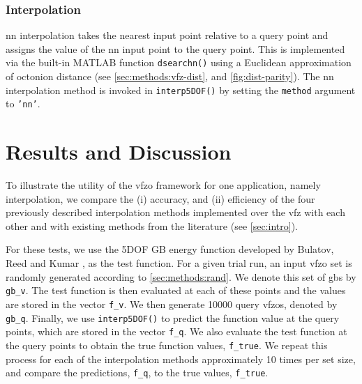 \documentclass[final,twocolumn,12pt]{elsarticle}
\newcommand{\inpt}{input}
\begin{document}
\subsubsection{ Interpolation}
\label{sec:methods:interp:nn}


\Gls{nn} interpolation takes the nearest \inpt{} point relative to a query point and assigns the value of the \gls{nn} \inpt{} point to the query point. This is implemented via the built-in MATLAB function \texttt{dsearchn()} using a Euclidean approximation of octonion distance (see \cref{sec:methods:vfz-dist}, and \cref{fig:dist-parity}). The \gls{nn} interpolation method is invoked in \texttt{interp5DOF()} by setting the \texttt{method} argument to \texttt{'nn'}.

\section{Results and Discussion} \label{sec:results}

To illustrate the utility of the \gls{vfzo} framework for one application, namely interpolation, we compare the (i) accuracy, and (ii) efficiency of the four previously described interpolation methods implemented over the \gls{vfz} with each other and with existing methods from the literature (see \cref{sec:intro}).

For these tests, we use the 5DOF GB energy function developed by Bulatov, Reed and Kumar \cite{bulatovGrainBoundaryEnergy2014}, as the test function. For a given trial run, an \inpt{} \gls{vfzo} set is randomly generated according to \cref{sec:methods:rand}. We denote this set of \glspl{gb} by \texttt{gb\_v}. The test function is then evaluated at each of these points and the values are stored in the vector \texttt{f\_v}. We then generate \num{10000} query \glspl{vfzo}, denoted by \texttt{gb\_q}. Finally, we use \texttt{interp5DOF()} \cite{bairdFiveDegreeofFreedom5DOF2020} to predict the function value at the query points, which are stored in the vector \texttt{f\_q}. We also evaluate the test function at the query points to obtain the true function values, \texttt{f\_true}. We repeat this process for each of the interpolation methods approximately 10 times per set size, and compare the predictions, \texttt{f\_q}, to the true values, \texttt{f\_true}.
\end{document}
